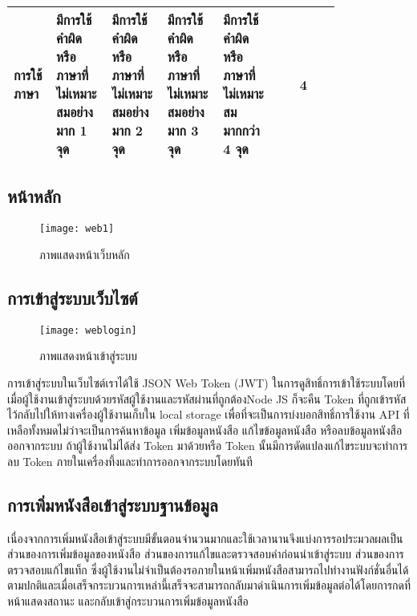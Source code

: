 \begin{table}[H]
\begin{flushleft}
\begin{tabular}{|p{0.13\linewidth}|p{0.17\linewidth}|p{0.17\linewidth}|p{0.17\linewidth}|p{0.17\linewidth}|c|}
การใช้ภาษา           & มีการใช้คำผิดหรือภาษาที่ไม่เหมาะสมอย่างมาก   1 จุด                                                               &  มีการใช้คำผิดหรือภาษาที่ไม่เหมาะสมอย่างมาก   2 จุด                                                &มีการใช้คำผิดหรือภาษาที่ไม่เหมาะสมอย่างมาก 3 จุด                                                                 & มีการใช้คำผิดหรือภาษาที่ไม่เหมาะสมมากกว่า 4 จุด                                               & 4           \\ \hline
\end{tabular}
\end{flushleft}
\end{table}

\subsection{หน้าหลัก}
\begin{figure}[H]
    \centering
    \texttt{[image: web1]}
    \caption{ภาพแสดงหน้าเว็บหลัก}\label{fig:web1}
\end{figure}

\subsection{การเข้าสู่ระบบเว็บไซต์}
\begin{figure}[H]
    \centering
    \texttt{[image: weblogin]}
    \caption{ภาพแสดงหน้าเข้าสู่ระบบ}\label{fig:weblogin}
\end{figure}
การเข้าสู่ระบบในเว็บไซต์เราได้ใช้ JSON Web Token (JWT) ในการดูสิทธิ์การเข้าใช้ระบบโดยที่เมื่อผู้ใช้งานเข้าสู่ระบบด้วยรหัสผู้ใช้งานและรหัสผ่านที่ถูกต้องNode JS ก็จะคืน Token ที่ถูกเข้ารหัสไว้กลับไปให้ทางเครื่องผู้ใช้งานเก็บใน local storage เพื่อที่จะเป็นการบ่งบอกสิทธิ์การใช้งาน API ที่เหลือทั้งหมดไม่ว่าจะเป็นการค้นหาข้อมูล เพิ่มข้อมูลหนังสือ แก้ไขข้อมูลหนังสือ หรือลบข้อมูลหนังสือออกจากระบบ ถ้าผู้ใช้งานไม่ได้ส่ง Token มาด้วยหรือ Token นั้นมีการดัดแปลงแก้ไขระบบจะทำการลบ Token ภายในเครื่องทึ้งและทำการออกจากระบบโดยทันที

\subsection{การเพิ่มหนังสือเข้าสู่ระบบฐานข้อมูล}
เนื่องจากการเพิ่มหนังสือเข้าสู่ระบบมีขั้นตอนจำนวนมากและใช้เวลานานจึงแบ่งการรอประมวลผลเป็นส่วนของการเพิ่มข้อมูลของหนังสือ ส่วนของการแก้ไขและตรวจสอบคำก่อนนำเข้าสู่ระบบ ส่วนของการตรวจสอบแก้ไขแท็ก ซึ่งผู้ใช้งานไม่จำเป็นต้องรอภายในหน้าเพิ่มหนังสือสามารถไปทำงานฟังก์ชั่นอื่นได้ตามปกติและเมื่อเสร็จกระบวนการเหล่านี้เสร็จจะสามารถกลับมาดำเนินการเพิ่มข้อมูลต่อได้โดยการกดที่หน้าแสดงสถานะ และกลับเข้าสู่กระบวนการเพิ่มข้อมูลหนังสือ
